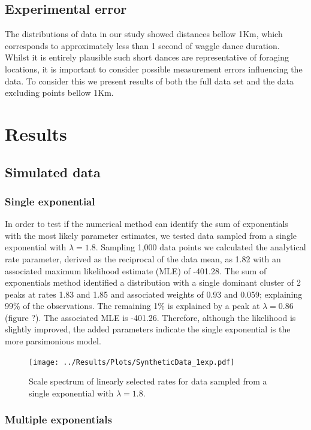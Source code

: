 \documentclass[11pt,usenames,dvipsnames]{article}
\begin{document}
\subsection{Experimental error}
The distributions of data in our study showed distances bellow 1Km, which corresponds to approximately less than 1 second of waggle dance duration. Whilst it is entirely plausible such short dances are representative of foraging locations, it is important to consider possible measurement errors influencing the data. To consider this we present results of both the full data set and the data excluding points bellow 1Km. 

\section{Results}

\noindent
\subsection{Simulated data}

\subsubsection{Single exponential}
In order to test if the numerical method can identify the sum of exponentials with the most likely parameter estimates, we tested data sampled from a single exponential with $\lambda = 1.8$. Sampling 1,000 data points we calculated the analytical rate parameter, derived as the reciprocal of the data mean, as 1.82 with an associated maximum likelihood estimate (MLE) of -401.28. The sum of exponentials method identified a distribution with a single dominant cluster of 2 peaks at rates 1.83 and 1.85 and associated weights of 0.93 and 0.059; explaining 99\% of the observations. The remaining 1\% is explained by a peak at $\lambda = 0.86$ (figure ?). The associated MLE is -401.26. Therefore, although the likelihood is slightly improved, the added parameters indicate the single exponential is the more parsimonious model.

\begin{figure}[H]
	\centering
	\texttt{[image: ../Results/Plots/SyntheticData\_1exp.pdf]}
	\caption{Scale spectrum of linearly selected rates for data sampled from a single exponential with $\lambda = 1.8$.}
\end{figure}


\subsubsection{Multiple exponentials}
\end{document}
